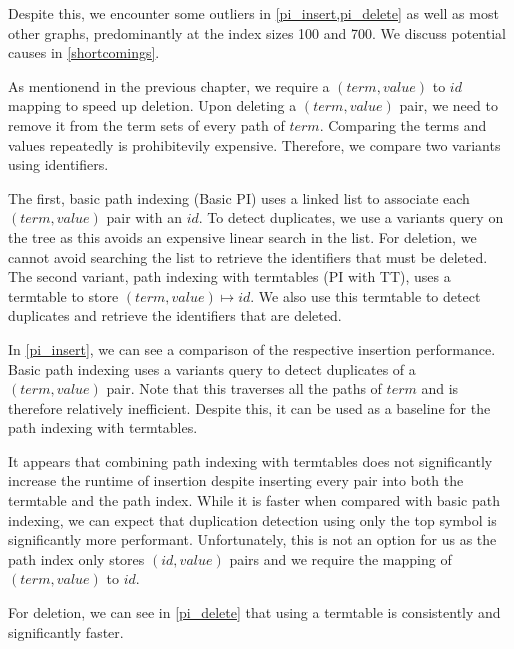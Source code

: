 Despite this, we encounter some outliers in \cref{pi_insert,pi_delete} as well as most other graphs, predominantly at the index sizes 100 and 700. We discuss potential causes in \cref{shortcomings}.

As mentionend in the previous chapter, we require a $(term,value)$ to $id$ mapping to speed up deletion. Upon deleting a $(term,value)$ pair, we need to remove it from the term sets of every path of $term$. Comparing the terms and values repeatedly is prohibitevily expensive. Therefore, we compare two variants using identifiers.

The first, basic path indexing (Basic PI) uses a linked list to associate each $(term,value)$ pair with an $id$. To detect duplicates, we use a variants query on the tree as this avoids an expensive linear search in the list. For deletion, we cannot avoid searching the list to retrieve the identifiers that must be deleted. The second variant, path indexing with termtables (PI with TT), uses a termtable to store $(term,value) \mapsto id$. We also use this termtable to detect duplicates and retrieve the identifiers that are deleted.

In \cref{pi_insert}, we can see a comparison of the respective insertion performance. Basic path indexing uses a variants query to detect duplicates of a $(term,value)$ pair. Note that this traverses all the paths of $term$ and is therefore relatively inefficient. Despite this, it can be used as a baseline for the path indexing with termtables.

It appears that combining path indexing with termtables does not significantly increase the runtime of insertion despite inserting every pair into both the termtable and the path index. While it is faster when compared with basic path indexing, we can expect that duplication detection using only the top symbol is significantly more performant. Unfortunately, this is not an option for us as the path index only stores $(id,value)$ pairs and we require the mapping of $(term,value)$ to $id$.

For deletion, we can see in \cref{pi_delete} that using a termtable is consistently and significantly faster.

